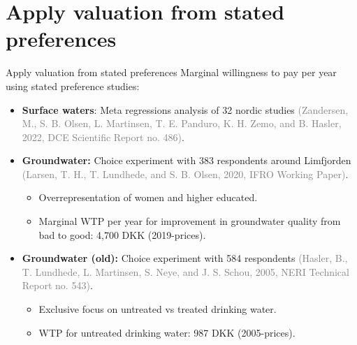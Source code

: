 \section{Apply valuation from stated preferences}

\begin{frame}{Apply valuation from stated preferences}\label<4>{frame:Valuation}
  Marginal willingness to pay per year using stated preference studies:
  \begin{itemize}
    \item \textbf{Surface waters}: Meta regressions analysis of 32 nordic studies \textcolor{grey}{(Zandersen, M., S. B. Olsen, L. Martinsen, T. E. Panduro, K. H. Zemo, and B. Hasler, 2022, DCE Scientific Report no. 486)}.
    \pause
    \item \textbf{Groundwater:} Choice experiment with 383 respondents around Limfjorden \textcolor{grey}{(Larsen, T. H., T. Lundhede, and S. B. Olsen, 2020, IFRO Working Paper)}. \hspace{4.5cm}\hyperlink{app:SurveyExample}{}
    \pause
    \begin{itemize}\normalsize
      \item Overrepresentation of women and higher educated.
      \item Marginal WTP per year for improvement in groundwater quality from bad to good: 4,700 DKK (2019-prices).
    \end{itemize}
    \pause
    \item \textbf{Groundwater (old):} Choice experiment with 584 respondents \textcolor{grey}{(Hasler, B., T. Lundhede, L. Martinsen, S. Neye, and J. S. Schou, 2005, NERI Technical Report no. 543)}.
    \begin{itemize}\normalsize
      \item Exclusive focus on untreated vs treated drinking water.
      \item WTP for untreated drinking water: 987 DKK (2005-prices).
    \end{itemize}      
  \end{itemize}
\end{frame}

